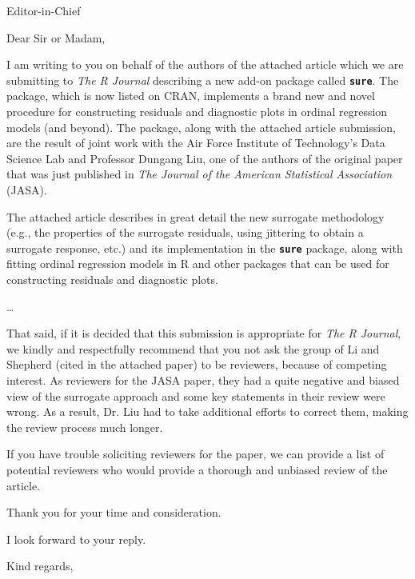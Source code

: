 \documentclass{letter}\usepackage[]{graphicx}\usepackage[]{color}
\begin{document}
\begin{letter}{Editor-in-Chief}

\opening{Dear Sir or Madam,}

I am writing to you on behalf of the authors of the attached article which we are submitting to \textit{The R Journal} describing a new add-on package called \textbf{\texttt{sure}}. The package, which is now listed on CRAN, implements a brand new and novel procedure for constructing residuals and diagnostic plots in ordinal regression models (and beyond). The package, along with the attached article submission, are the result of joint work with the Air Force Institute of Technology's Data Science Lab and Professor Dungang Liu, one of the authors of the original paper that was just published in \textit{The Journal of the American Statistical Association} (JASA).

The attached article describes in great detail the new surrogate methodology (e.g., the properties of the surrogate residuals, using jittering to obtain a surrogate response, etc.) and its implementation in the \textbf{\texttt{sure}} package, along with fitting ordinal regression models in R and other packages that can be used for constructing residuals and diagnostic plots.

\ldots

That said, if it is decided that this submission is appropriate for \textit{The R Journal}, we kindly and respectfully recommend that you not ask the group of Li and Shepherd (cited in the attached paper) to be reviewers, because of competing interest. As reviewers for the JASA paper, they had a quite negative and biased view of the surrogate approach and some key statements in their review were wrong. As a result, Dr. Liu had to take additional efforts to correct them, making the review process much longer.
 
If you have trouble soliciting reviewers for the paper, we can provide a list of potential reviewers who would provide a thorough and unbiased review of the article.

Thank you for your time and consideration.

I look forward to your reply.

\closing{Kind regards,}


\end{letter}
\end{document}
